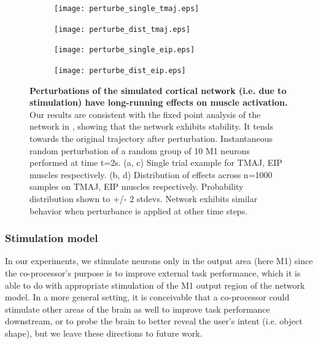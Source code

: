 \documentclass[12pt]{iopart}
\begin{document}
\begin{figure}[h]
	\centering
	\begin{subfigure}[c]{0.48\textwidth}
	    \centering
	    \texttt{[image: perturbe\_single\_tmaj.eps]}
	    \caption{}
	\end{subfigure}
	\hfill
	\begin{subfigure}[c]{0.48\textwidth}
	    \centering
	    \texttt{[image: perturbe\_dist\_tmaj.eps]}
	    \caption{}
	\end{subfigure}
	\hfill
	\begin{subfigure}[c]{0.48\textwidth}
	    \centering
	    \texttt{[image: perturbe\_single\_eip.eps]}
	    \caption{}
	\end{subfigure}
	\hfill
	\begin{subfigure}[c]{0.48\textwidth}
	    \centering
	    \texttt{[image: perturbe\_dist\_eip.eps]}
	    \caption{}
	\end{subfigure}
	\hfill
	\caption{\textbf{Perturbations of the simulated cortical network (i.e. due to stimulation)
	         have long-running effects on muscle activation.} Our results are consistent with
	         the fixed point analysis of the network in \cite{michaels.mrnn}, showing that the network
	         exhibits stability. It tends towards the original trajectory after perturbation.
	         Instantaneous random perturbation of a random group of 10 M1
	         neurons performed at time t=2s. (a, c) Single trial example for TMAJ, EIP muscles
	         respectively. (b, d) Distribution of effects across n=1000 samples on TMAJ, EIP muscles
	         respectively. Probability distribution shown to +/- 2 stdevs. Network exhibits similar
	         behavior when perturbance is applied at other time steps.}
	\label{fig:dynamics}
\end{figure}

\subsubsection{Stimulation model}
In our experiments, we stimulate neurons only in the output area (here M1) since the co-processor's
purpose is to improve external task performance, which it is able to do with
appropriate stimulation of the M1 output region of the network model. In a more general setting, it is
conceivable that a co-processor could stimulate other areas of the brain as well to improve task
performance downstream, or to probe the brain to better reveal the user's intent (i.e. object
shape), but we leave these directions to future work.
\end{document}
